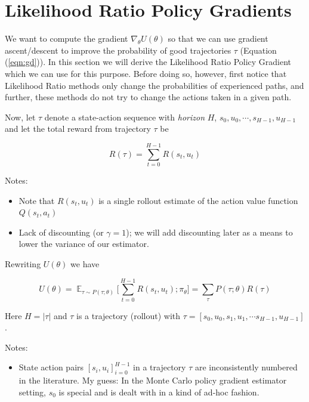 \documentclass[11pt, oneside]{article}                          %
\DeclareMathOperator{\E}{\mathbb{E}}
\begin{document}
\section{Likelihood Ratio Policy Gradients}
We want to compute the gradient $\nabla_{\theta} U(\theta)$ so
that we can use gradient ascent/descent to improve the
probability of good trajectories $\tau$ (Equation
(\ref{eqn:gd})). In this section we will derive the Likelihood
Ratio Policy Gradient which we can use for this purpose.  Before
doing so, however, first notice that Likelihood Ratio methods
only change the probabilities of experienced paths, and further,
these methods do not try to change the actions taken in a given
path.

\bigskip
\noindent
Now, let $\tau$ denote a state-action sequence with
\emph{horizon} $H$, $s_0,u_0,\cdots,s_{H - 1},u_{H - 1}$ and let
the total reward from trajectory $\tau$ be

\bigskip
\begin{equation*}
R(\tau) = \sum\limits_{t = 0}^{H - 1} R(s_t,u_t)
\end{equation*}

\noindent
Notes:
\begin{itemize}
\item Note that $R(s_t,u_t)$ is a single rollout estimate of the 
action value function $Q(s_t,a_t)$ 
\item Lack of discounting (or $\gamma = 1$); we will add
discounting later as a means to lower the variance of our
estimator. 
\end{itemize}

\bigskip
\noindent
Rewriting $U(\theta)$ we have

\bigskip
\begin{equation}
\label{eqn:u}
U(\theta) = \E_{\tau \sim P(\tau;\theta)} \Bigg [\sum\limits_{t =
0}^{H - 1} R(s_t,u_t) ; \pi_\theta \Bigg ] =
\sum\limits_{\tau}P(\tau; \theta)R(\tau) 
\end{equation}

\bigskip
\noindent
Here $H = |\tau |$ and $\tau$ is a trajectory (rollout) with
$\tau = [s_0,u_0, s_1,u_1, \cdots s_{H-1},u_{H-1}]$.

\bigskip
\noindent
Notes:
\begin{itemize}
\item State action pairs $[s_i,u_i]^{H-1}_{i = 0}$ in a
trajectory $\tau$ are inconsistently numbered in the literature.
My guess: In the Monte Carlo policy gradient estimator setting,
$s_0$ is special and is dealt with in a kind of ad-hoc fashion.
\end{itemize}
\end{document}
